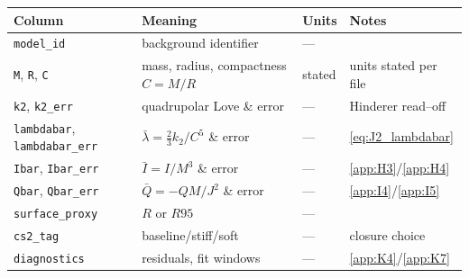 \documentclass{iopjournal}
\begin{document}
\begin{table}[H]
  \setlength{\tabcolsep}{4pt}%
  \renewcommand{\arraystretch}{1.05}%
  \begin{tabularx}{\linewidth}{@{} l l l Y @{}}
  \toprule
  Column & Meaning & Units & Notes \\
  \midrule
  \texttt{model\_id}                       & background identifier                 & ---    & \\
  \texttt{M}, \texttt{R}, \texttt{C}       & mass, radius, compactness $C=M/R$     & stated & units stated per file \\
  \texttt{k2}, \texttt{k2\_err}            & quadrupolar Love \& error              & ---    & Hinderer read--off \\
  \texttt{lambdabar}, \texttt{lambdabar\_err} & $\bar\lambda=\tfrac{2}{3}k_2/C^5$ \& error & ---    & \eqref{eq:J2_lambdabar} \\
  \texttt{Ibar}, \texttt{Ibar\_err}        & $\bar I=I/M^3$ \& error               & ---    & \cref{app:H3}/\cref{app:H4} \\
  \texttt{Qbar}, \texttt{Qbar\_err}        & $\bar Q=-QM/J^2$ \& error             & ---    & \cref{app:I4}/\cref{app:I5} \\
  \texttt{surface\_proxy}                  & $R$ or $R95$                          & ---    & \\
  \texttt{cs2\_tag}                        & baseline/stiff/soft                   & ---    & closure choice \\
  \texttt{diagnostics}                     & residuals, fit windows                & ---    & \cref{app:K4}/\cref{app:K7} \\
  \bottomrule
  \end{tabularx}%
\end{table}
\end{document}
